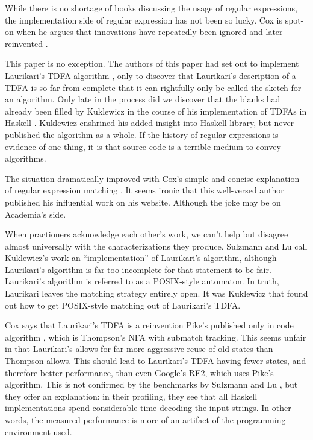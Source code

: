 \documentclass[english]{sigplanconf}
\theoremstyle{definition}
\newcommand{\ra}{$\rightarrow$}
\newcommand{\del}[1]{\textcolor{red}{\sout{#1}}} %
\newcommand{\chg}[2]{\textcolor{red}{\sout{#1}}{\ra}\textcolor{blue}{\uline{#2}}} %
\newcommand{\del}[1]{} %
\newcommand{\chg}[2]{#2}
\renewcommand{\del}[1]{} %
\renewcommand{\chg}[2]{#2} %
\begin{document}
While there is no shortage of books discussing the usage of regular
expressions, the implementation side of regular expression has not
been so lucky. Cox is spot-on when he argues that innovations have
repeatedly been ignored and later reinvented \cite{Cox07a,Cox09a,Cox10a}. 

This paper is no exception. The authors of this paper had set out
to implement Laurikari's TDFA algorithm \cite{Laur00a},
only to discover that Laurikari's description of a TDFA is so far
from complete that it can rightfully only be called the sketch for
an algorithm. Only late in the process did we discover that the blanks
had already been filled by Kuklewicz in the course of his implementation
of TDFAs in Haskell \cite{Kukl07a}. Kuklewicz enshrined his
added insight into Haskell library, but never published the algorithm
as a whole. If the history of regular expressions is evidence of one
thing, it is that source code is a terrible medium to convey algorithms. 

The situation dramatically improved with Cox's simple and concise
explanation of regular expression matching \cite{Cox07a}. It seems
ironic that this well-versed author published his influential work
on his website. Although the joke may be on Academia's side.

When \del{the taciturn} practioners acknowledge each other's work, we can't
help but disagree almost universally with the characterizations they
produce. Sulzmann and Lu \cite{Sulz12a} call Kuklewicz's
work an ``implementation'' of Laurikari's algorithm, although Laurikari's
algorithm is far too incomplete for that statement to be fair. Laurikari's
algorithm is referred to as a POSIX-style automaton. In truth, Laurikari
leaves the matching strategy entirely open. It was Kuklewicz that
found out how to get POSIX-style matching out of Laurikari's TDFA. 

Cox says that Laurikari's TDFA is a reinvention Pike's published only
in code algorithm \cite{Pike87a}, which is Thompson's NFA with submatch
tracking. This seems unfair in that Laurikari's allows for far more
aggressive \chg{reusing}{reuse} of old states than \del{what} Thompson allows. This should
lead to Laurikari's TDFA having fewer states, and therefore better
performance, than even Google's RE2, which uses Pike's algorithm.
This is not confirmed by the benchmarks by Sulzmann and Lu \cite{Sulz12a},
but they offer an explanation: in their profiling, they see that all
Haskell implementations spend considerable time decoding the input
strings. In other words, the measured performance is more of an artifact
of the programming environment used. 
\end{document}
